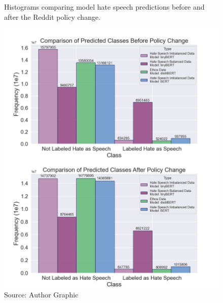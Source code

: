 \documentclass[conference]{IEEEtran}
\begin{document}
\begin{figure} [ht!]
    \centering
    \caption{Histograms comparing model hate speech predictions before and after the Reddit policy change.}
    \label{fig:histogram}
    \includegraphics[scale = .5]{combined_histogram.png}
    \caption*{Source: Author Graphic}
\end{figure}
\clearpage
\end{document}
